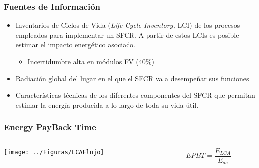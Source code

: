\documentclass[xcolor=dvipsnames]{beamer}
\begin{document}
\begin{frame}
  \frametitle{Fuentes de Información}
    \begin{itemize}
    \item Inventarios de Ciclos de Vida (\emph{Life Cycle
        Inventory,} LCI) de los procesos empleados para
      implementar un SFCR. A partir de estos LCIs es posible
      estimar el impacto energético asociado.
      \begin{itemize}
      \item Incertidumbre alta en módulos FV (40\%)
      \end{itemize}
    \item Radiación global del lugar en el que el SFCR va a
      desempeñar sus funciones
    \item Características técnicas de los diferentes componentes
      del SFCR que permitan estimar la energía producida a lo
      largo de toda su vida útil.
    \end{itemize}
 
\end{frame}


\begin{frame}
  \frametitle{Energy PayBack Time}
  \begin{columns}
    \begin{column}{7cm}
          \texttt{[image: ../Figuras/LCAFlujo]}
    \end{column}
    \begin{column}{3cm}
      \begin{equation*}
        EPBT=\frac{E_{LCA}}{E_{ac}}
      \end{equation*}
    \end{column}
  \end{columns}
\end{frame}
\end{document}
